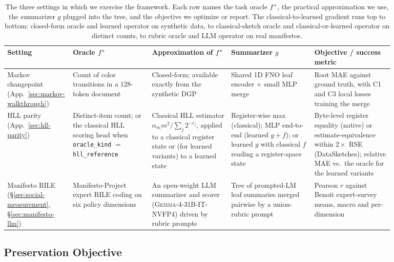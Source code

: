 \begin{table}[htbp]
\centering\small
\setlength{\tabcolsep}{4pt}
\begin{tabular}{p{0.11\linewidth}p{0.20\linewidth}p{0.20\linewidth}p{0.21\linewidth}p{0.20\linewidth}}
\toprule
Setting & Oracle $f^\ast$ & Approximation of $f^\ast$ & Summarizer $g$ & Objective / success metric \\
\midrule
Markov changepoint (App.~\ref{sec:markov-walkthrough}) &
Count of color transitions in a $128$-token document &
Closed-form; available exactly from the synthetic DGP &
Shared 1D FNO leaf encoder $+$ small MLP merge &
Root MAE against ground truth, with C1 and C3 local losses training the merge \\[2pt]
HLL parity (App.~\ref{sec:hll-parity}) &
Distinct-item count; or the classical HLL scoring head when \texttt{oracle\_kind} $=$ \texttt{hll\_reference} &
Classical HLL estimator $\alpha_m m^2 / \sum_j 2^{-r_j}$, applied to a classical register state or (for learned variants) to a learned state &
Register-wise max (classical); MLP end-to-end (learned $g{+}f$); or learned $g$ with classical $f$ reading a register-space state &
Byte-level register equality (native) or estimate-equivalence within $2\times$ RSE (DataSketches); relative MAE vs.\ the oracle for the learned variants \\[2pt]
Manifesto RILE (\S\ref{sec:social-measurement}, \S\ref{sec:manifesto-llm}) &
Manifesto-Project expert RILE coding on six policy dimensions &
An open-weight LLM summarizer and scorer (\textsc{Gemma-4-31B-IT-NVFP4}) driven by rubric prompts &
Tree of prompted-LM leaf summaries merged pairwise by a union-rubric prompt &
Pearson $r$ against Benoit expert-survey means, macro and per-dimension \\
\bottomrule
\end{tabular}
\caption{The three settings in which we exercise the framework. Each row names the task oracle $f^\ast$, the practical approximation we use, the summarizer $g$ plugged into the tree, and the objective we optimize or report. The classical-to-learned gradient runs top to bottom: closed-form oracle and learned operator on synthetic data, to classical-sketch oracle and classical-or-learned operator on distinct counts, to rubric oracle and LLM operator on real manifestos.}
\label{tab:settings-comparison}
\end{table}

\subsection{Preservation Objective}

